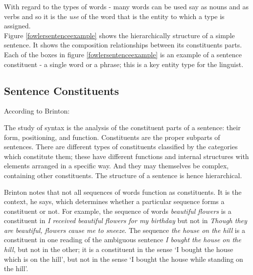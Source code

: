 \noindent With regard to the types of words - many words can be used say as nouns and as verbs and so it is the \emph{use} of the word that is the entity to which a type is assigned. \\

\noindent Figure \ref{fowlersentenceexample} shows the hierarchically structure of a simple sentence. It shows the composition relationships between its constituents parts. Each of the boxes in figure \ref{fowlersentenceexample} is an example of a sentence constituent - a single word or a phrase; this is a key entity type for the linguist.
{}

\subsection{Sentence Constituents}

\noindent According to Brinton:
\begin{erquote}
The study of syntax is the analysis of the constituent parts of a sentence: their form, positioning,
and function. Constituents are the proper subparts of sentences. There are different
types of constituents classified by the categories which constitute them; these have different
functions and internal structures with elements arranged in a specific way. And they may
themselves be complex, containing other constituents. The structure of a sentence is hence
hierarchical.
\end{erquote}
\noindent Brinton notes that not all sequences of words function as constituents. It is the context, he says,  which determines whether a particular sequence forms a constituent or not. For example, the sequence of words \textit{beautiful flowers} is a constituent in \textit{I received beautiful flowers for my birthday} but not in \textit{Though they are beautiful, flowers cause me to sneeze}. The sequence \textit{the house on the hill} is a constituent in one reading of the ambiguous sentence \textit{I bought the house on the hill}, but not in the other; it is a constituent in the sense `I bought the house which is on the hill', but not in the sense `I bought the house while standing on the hill'.\\


